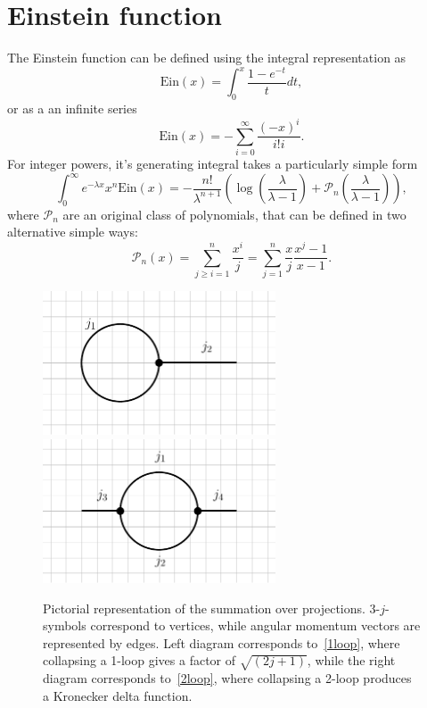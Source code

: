 \section{Einstein function}
\label{app:Ein}

The Einstein function can be defined using the integral representation as
\begin{equation}
    \text{Ein}(x)=\int_0^x\frac{1-e^{-t}}{t}dt,
\end{equation}
or as a an infinite series
\begin{equation}
    \text{Ein}(x)=-\sum_{i=0}^{\infty}\frac{(-x)^i}{i!i}.
\end{equation}
For integer powers, it's generating integral takes a particularly simple form
\begin{equation}
    \int_0^\infty e^{-\lambda x}x^n\text{Ein}(x)=-\frac{n!}{\lambda^{n+1}}\left(\log\left(\frac{\lambda}{\lambda-1}\right)+\mathcal{P}_n\left(\frac{\lambda}{\lambda-1}\right)\right),
\end{equation}
where $\mathcal{P}_n$ are an original class of polynomials, that can be defined in two alternative simple ways:
\begin{equation}
    \mathcal{P}_n(x) = \sum_{j \geq i =1}^n \frac{x^i}{j} = \sum_{j=1}^n \frac{x}{j}\frac{x^j-1}{x-1}.
\end{equation}

\begin{figure}
    \centering
    \includegraphics[width=69mm]{Graphs/1loop.pdf}
    \includegraphics[width=69mm]{Graphs/2loop.pdf}
    \caption{Pictorial representation of the summation over projections. 3-$j$-symbols correspond to vertices, while angular momentum vectors are represented by edges. Left diagram corresponds to~\eqref{1loop}, where collapsing a 1-loop gives a factor of $\sqrt{(2j+1)}$, while the right diagram corresponds to~\eqref{2loop}, where collapsing a 2-loop produces a Kronecker delta function.}
    \label{fig:loops}
\end{figure}

